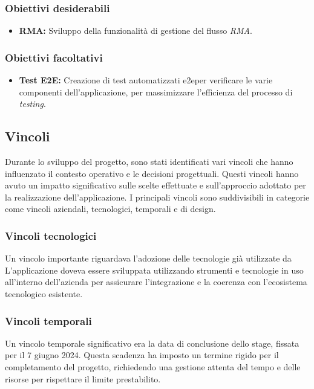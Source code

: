 \subsubsection{Obiettivi desiderabili}
\begin{itemize}
    \item \textbf{RMA:} Sviluppo della funzionalità di gestione del flusso \textit{RMA}.
\end{itemize}

\subsubsection{Obiettivi facoltativi}
\begin{itemize}
    \item \textbf{Test E2E:} Creazione di test automatizzati \gls{e2e}\glox per verificare le varie componenti dell'applicazione, per massimizzare l'efficienza del processo di \textit{testing}.
\end{itemize}

\subsection{Vincoli}

Durante lo sviluppo del progetto, sono stati identificati vari vincoli che hanno influenzato il contesto operativo e le decisioni progettuali. 
Questi vincoli hanno avuto un impatto significativo sulle scelte effettuate e sull'approccio adottato per la realizzazione dell'applicazione. 
I principali vincoli sono suddivisibili in categorie come vincoli aziendali, tecnologici, temporali e di design.
\subsubsection{Vincoli tecnologici}
Un vincolo importante riguardava l'adozione delle tecnologie già utilizzate da \myAzienda
L'applicazione doveva essere sviluppata utilizzando strumenti e tecnologie in uso all'interno dell'azienda per assicurare l'integrazione e la coerenza con l'ecosistema tecnologico esistente.
\subsubsection{Vincoli temporali}
Un vincolo temporale significativo era la data di conclusione dello stage, fissata per il 7 giugno 2024.
Questa scadenza ha imposto un termine rigido per il completamento del progetto, richiedendo una gestione attenta del tempo e delle risorse per rispettare il limite prestabilito.
